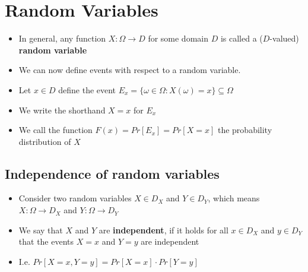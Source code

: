 \newpage

	\section{Random Variables}
		\begin{itemize}
			\item In general, any function $X: \Omega \to D$ for some domain $D$ is called a ($D$-valued) \textbf{random variable}
			\item We can now define events with respect to a random variable.
			\item Let $x \in D$ define the event $E_x = \{ \omega \in \Omega: X(\omega)=x \} \subseteq \Omega$
			\item We write the shorthand $X=x$ for $E_x$
			\item We call the function $F(x) = Pr[E_x] = Pr[X=x]$ the probability distribution of $X$
		\end{itemize}
	
		\subsection{Independence of random variables}
			\begin{itemize}
				\item Consider two random variables $X \in D_X$ and $Y \in D_Y$, which means $X: \Omega \to D_X$ and $Y: \Omega \to D_Y$
				\item We say that $X$ and $Y$ are \textbf{independent}, if it holds for all $x \in D_X$ and $y \in D_Y$ that the events $X=x$ and $Y=y$ are independent
				\item I.e. $Pr[X=x,Y=y] = Pr[X=x] \cdot Pr[Y=y]$
			\end{itemize}
		
